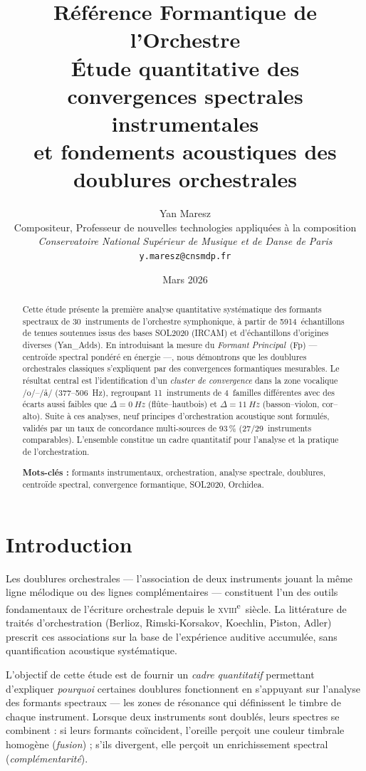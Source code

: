\documentclass[11pt,a4paper]{article}
\title{%
  \textbf{Référence Formantique de l'Orchestre}\\[6pt]
  \large Étude quantitative des convergences spectrales instrumentales\\
  et fondements acoustiques des doublures orchestrales%
}
\author{%
  Yan Maresz\\
  Compositeur, Professeur de nouvelles technologies appliquées à la composition\\
  \textit{Conservatoire National Supérieur de Musique et de Danse de Paris}\\
  \texttt{y.maresz@cnsmdp.fr}%
}
\date{Mars 2026}
\begin{document}
\maketitle

\begin{abstract}
Cette étude présente la première analyse quantitative systématique des
formants spectraux de 30~instruments de l'orchestre symphonique, à partir
de \num{5914}~échantillons de tenues soutenues issus des bases SOL2020
(IRCAM) et d'échantillons d'origines diverses (Yan\_Adds). En introduisant la mesure du \emph{Formant
Principal}~(Fp) --- centroïde spectral pondéré en énergie ---, nous
démontrons que les doublures orchestrales classiques s'expliquent par des
convergences formantiques mesurables. Le résultat central est
l'identification d'un \emph{cluster de convergence} dans la zone
vocalique /o/--/\r{a}/ (377--506~Hz), regroupant 11~instruments de
4~familles différentes avec des écarts aussi faibles que $\Delta =
\SI{0}{Hz}$ (flûte--hautbois) et $\Delta = \SI{11}{Hz}$
(basson--violon, cor--alto). Suite à ces analyses, neuf principes d'orchestration acoustique
sont formulés, validés par un taux de concordance multi-sources de
93\,\% (27/29~instruments comparables). L'ensemble constitue un cadre
quantitatif pour l'analyse et la pratique de l'orchestration.

\medskip
\noindent\textbf{Mots-clés :} formants instrumentaux, orchestration,
analyse spectrale, doublures, centroïde spectral, convergence
formantique, SOL2020, Orchidea.
\end{abstract}


\section{Introduction}

Les doublures orchestrales --- l'association de deux instruments jouant
la même ligne mélodique ou des lignes complémentaires --- constituent
l'un des outils fondamentaux de l'écriture orchestrale depuis le
\textsc{xviii}\textsuperscript{e}~siècle. La littérature de traités
d'orchestration (Berlioz, Rimski-Korsakov, Koechlin, Piston, Adler)
prescrit ces associations sur la base de l'expérience auditive
accumulée, sans quantification acoustique systématique.

L'objectif de cette étude est de fournir un \emph{cadre quantitatif}
permettant d'expliquer \emph{pourquoi} certaines doublures fonctionnent
en s'appuyant sur l'analyse des formants spectraux --- les zones de
résonance qui définissent le timbre de chaque instrument. Lorsque deux
instruments sont doublés, leurs spectres se combinent : si leurs
formants coïncident, l'oreille perçoit une couleur timbrale homogène
(\emph{fusion}) ; s'ils divergent, elle perçoit un enrichissement
spectral (\emph{complémentarité}).
\end{document}
